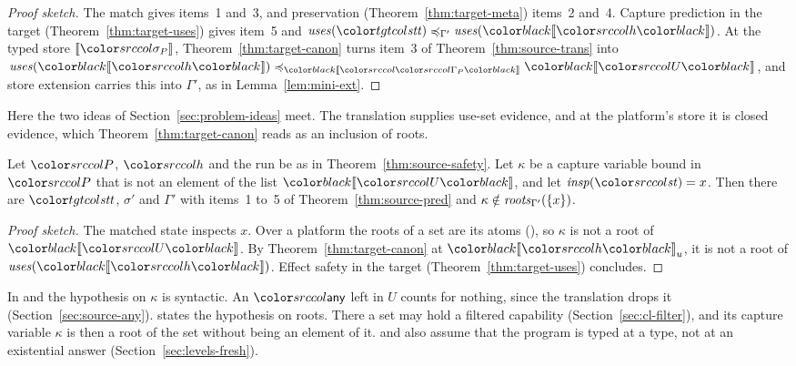 \begin{proof}[Proof sketch]
The match gives items~1 and~3, and preservation (Theorem~\ref{thm:target-meta}) items~2 and~4. Capture prediction in the target (Theorem~\ref{thm:target-uses}) gives item~5 and $\caple{\Gamma'}{\uses{\tstate}}{\uses{\trans{h}}}$. At the typed store $\tplatstore$, Theorem~\ref{thm:target-canon} turns item~3 of Theorem~\ref{thm:source-trans} into $\caple{\trans{\platctx}}{\uses{\trans{h}}}{\trans{U}}$, and store extension carries this into $\Gamma'$, as in Lemma~\ref{lem:mini-ext}.
\end{proof}

Here the two ideas of Section~\ref{sec:problem-ideas} meet. The translation supplies use-set evidence, and at the platform's store it is closed evidence, which Theorem~\ref{thm:target-canon} reads as an inclusion of roots.

\begin{theorem}\label{thm:source-effect}
Let $\plat$, $\src{h}$ and the run be as in Theorem~\ref{thm:source-safety}. Let $\kappa$ be a capture variable bound in $\plat$ that is not an element of the list $\trans{U}$, and let $\insp{\src{\mathit{st}}} = x$. Then there are $\tstate$, $\sigma'$ and $\Gamma'$ with items~1 to~5 of Theorem~\ref{thm:source-pred} and $\kappa \notin \mathit{roots}_{\Gamma'}(\{x\})$.
\end{theorem}

\begin{proof}[Proof sketch]
The matched state inspects $x$. Over a platform the roots of a set are its atoms (), so $\kappa$ is not a root of $\trans{U}$. By Theorem~\ref{thm:target-canon} at $\transu{h}$, it is not a root of $\uses{\trans{h}}$. Effect safety in the target (Theorem~\ref{thm:target-uses}) concludes.
\end{proof}

In \treeK and \treeCC the hypothesis on $\kappa$ is syntactic. An $\cany$ left in $U$ counts for nothing, since the translation drops it (Section~\ref{sec:source-any}). \treeCL states the hypothesis on roots. There a set may hold a filtered capability (Section~\ref{sec:cl-filter}), and its capture variable $\kappa$ is then a root of the set without being an element of it. \treeCC and \treeCL also assume that the program is typed at a type, not at an existential answer (Section~\ref{sec:levels-fresh}).

